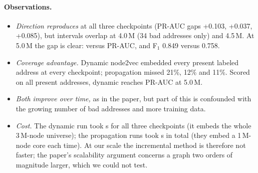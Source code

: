 \paragraph{Observations.}
\begin{itemize}
\item \emph{Direction reproduces} at all three checkpoints (PR-AUC gaps +0.103, +0.037, +0.085), but intervals overlap at 4.0\,M (34 bad addresses only) and 4.5\,M. At 5.0\,M the gap is clear: \TFourDynPR{} versus \TFourPropPR{} PR-AUC, and F$_1$ 0.849 versus 0.758.
\item \emph{Coverage advantage.} Dynamic node2vec embedded every present labeled address at every checkpoint; propagation missed 21\%, 12\% and 11\%. Scored on all present addresses, dynamic reaches \DynAllPR{} PR-AUC at 5.0\,M.
\item \emph{Both improve over time,} as in the paper, but part of this is confounded with the growing number of bad addresses and more training data.
\item \emph{Cost.} The dynamic run took \DynSeconds{} s for all three checkpoints (it embeds the whole 3\,M-node universe); the propagation runs took \PropSeconds{} s in total (they embed a 1\,M-node core each time). At our scale the incremental method is therefore not faster; the paper's scalability argument concerns a graph two orders of magnitude larger, which we could not test.
\end{itemize}


